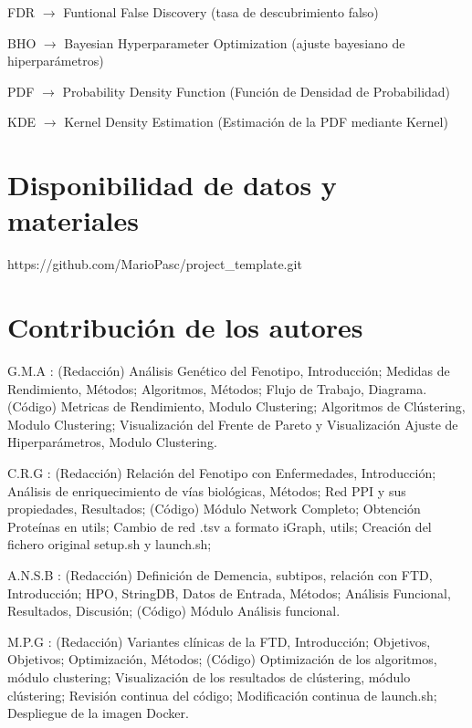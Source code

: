 \documentclass{bmcart}
\begin{document}
\begin{backmatter}
			FDR $\rightarrow$ Funtional False Discovery (tasa de descubrimiento falso)
			
			BHO $\rightarrow$ Bayesian Hyperparameter Optimization (ajuste bayesiano de hiperparámetros)	
			
			PDF $\rightarrow$ Probability Density Function (Función de Densidad de Probabilidad)
			
			KDE $\rightarrow$ Kernel Density Estimation (Estimación de la PDF mediante Kernel)
			
		
		\section*{Disponibilidad de datos y materiales}%
			https://github.com/MarioPasc/project\_template.git
		
		\section*{Contribución de los autores}
		
			G.M.A : (Redacción) Análisis Genético del Fenotipo, Introducción; Medidas de Rendimiento, Métodos; Algoritmos, Métodos; Flujo de Trabajo, Diagrama. (Código) Metricas de Rendimiento, Modulo Clustering; Algoritmos de Clústering, Modulo Clustering; Visualización del Frente de Pareto y Visualización Ajuste de Hiperparámetros, Modulo Clustering. 
			
			C.R.G : (Redacción) Relación del Fenotipo con Enfermedades, Introducción; Análisis de enriquecimiento de vías biológicas, Métodos; Red PPI y sus propiedades, Resultados; (Código) Módulo Network Completo; Obtención Proteínas en utils; Cambio de red .tsv a formato iGraph, utils; Creación del fichero original setup.sh y launch.sh; 
			
			A.N.S.B : (Redacción) Definición de Demencia, subtipos, relación con FTD, Introducción; HPO, StringDB, Datos de Entrada, Métodos; Análisis Funcional, Resultados, Discusión; (Código) Módulo Análisis funcional. 
			
			M.P.G : (Redacción) Variantes clínicas de la FTD, Introducción; Objetivos, Objetivos; Optimización, Métodos; (Código) Optimización de los algoritmos, módulo clustering; Visualización de los resultados de clústering, módulo clústering; Revisión continua del código; Modificación continua de launch.sh; Despliegue de la imagen Docker. 
	
		
		
		
	
	\end{backmatter}
\end{document}
